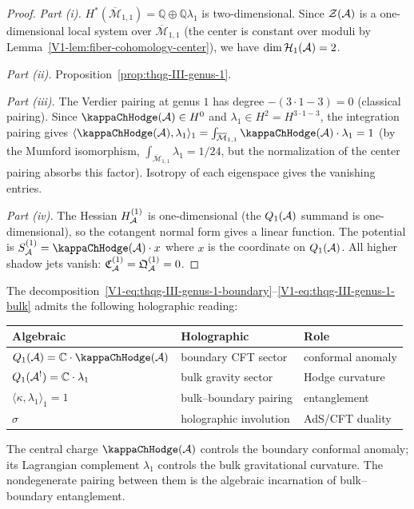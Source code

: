 \begin{proof}
\emph{Part (i).}
$H^*(\overline{\mathcal{M}}_{1,1}) = \mathbb{Q} \oplus
\mathbb{Q}\lambda_1$ is two-dimensional.
Since $\mathcal{Z}(\mathcal{A})$ is a one-dimensional local system
over $\overline{\mathcal{M}}_{1,1}$ (the center is constant
over moduli by
Lemma~\ref{V1-lem:fiber-cohomology-center}), we have
$\dim \mathcal{H}_1(\mathcal{A}) = 2$.

\emph{Part (ii).}
Proposition~\ref{prop:thqg-III-genus-1}.

\emph{Part (iii).}
The Verdier pairing at genus $1$ has degree
$-(3 \cdot 1 - 3) = 0$ (classical pairing).
Since $\kappaChHodge(\cA) \in H^0$ and
$\lambda_1 \in H^2 = H^{3 \cdot 1 - 3}$,
the integration pairing gives
$\langle \kappaChHodge(\cA), \lambda_1 \rangle_1
= \int_{\overline{\mathcal{M}}_{1,1}} \kappaChHodge(\cA) \cdot
\lambda_1 = 1$ (by the Mumford isomorphism,
$\int_{\overline{\mathcal{M}}_{1,1}} \lambda_1 = 1/24$,
but the normalization of the center pairing absorbs this
factor). Isotropy of each eigenspace gives the vanishing
entries.

\emph{Part (iv).}
The Hessian $H_{\mathcal{A}}^{(1)}$ is one-dimensional (the
$Q_1(\mathcal{A})$ summand is one-dimensional), so the cotangent
normal form gives a linear function. The potential is
$S_\cA^{(1)} = \kappaChHodge(\cA) \cdot x$ where $x$ is the
coordinate on $Q_1(\mathcal{A})$. All higher shadow jets vanish:
$\mathfrak{C}_{\mathcal{A}}^{(1)} = \mathfrak{Q}_{\mathcal{A}}^{(1)} = 0$.
\end{proof}

\begin{remark}
The decomposition~\eqref{V1-eq:thqg-III-genus-1-boundary}--\eqref{V1-eq:thqg-III-genus-1-bulk}
admits the following holographic reading:
\begin{center}
\renewcommand{\arraystretch}{1.2}
\begin{tabular}{l@{\quad}l@{\quad}l}
\textbf{Algebraic} & \textbf{Holographic} & \textbf{Role} \\
\midrule
$Q_1(\cA) = \mathbb{C} \cdot \kappaChHodge(\cA)$ &
 boundary CFT sector &
 conformal anomaly \\
$Q_1(\mathcal{A}^!) = \mathbb{C} \cdot \lambda_1$ &
 bulk gravity sector &
 Hodge curvature \\
$\langle \kappa, \lambda_1 \rangle_1 = 1$ &
 bulk--boundary pairing &
 entanglement \\
$\sigma$ &
 holographic involution &
 AdS/CFT duality \\
\end{tabular}
\end{center}
The central charge $\kappaChHodge(\cA)$ controls the
boundary conformal anomaly; its Lagrangian complement
$\lambda_1$ controls the bulk gravitational curvature.
The nondegenerate pairing between them is the algebraic
incarnation of bulk--boundary entanglement.
\end{remark}

